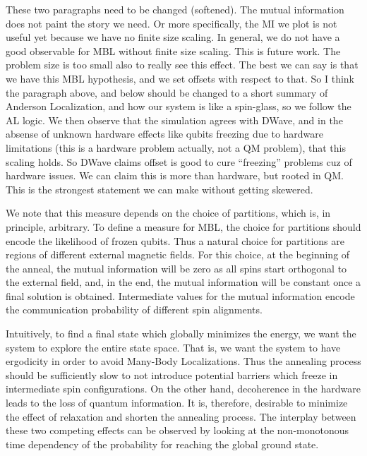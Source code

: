 \documentclass[prd,twocolumn,tightenlines,preprintnumbers,showpacs,superscriptaddress,notitlepage,nofootinbib,eqsecnum,floatfix,longbibliography,aps,10pt]{revtex4-2}
\begin{document}
{\color{blue} These two paragraphs need to be changed (softened). The mutual information does not paint the story we need. Or more specifically, the MI we plot is not useful yet because we have no finite size scaling. In general, we do not have a good observable for MBL without finite size scaling. This is future work. The problem size is too small also to really see this effect. The best we can say is that we have this MBL hypothesis, and we set offsets with respect to that. So I think the paragraph above, and below should be changed to a short summary of Anderson Localization, and how our system is like a spin-glass, so we follow the AL logic. We then observe that the simulation agrees with DWave, and in the absense of unknown hardware effects like qubits freezing due to hardware limitations (this is a hardware problem actually, not a QM problem), that this scaling holds. So DWave claims offset is good to cure ``freezing'' problems cuz of hardware issues. We can claim this is more than hardware, but rooted in QM. This is the strongest statement we can make without getting skewered.}
{\color{red}
We note that this measure depends on the choice of partitions, which is, in principle, arbitrary.
To define a measure for MBL, the choice for partitions should encode the likelihood of frozen qubits.
Thus a natural choice for partitions are regions of different external magnetic fields.
For this choice, at the beginning of the anneal, the mutual information will be zero as all spins start orthogonal to the external field, and, in the end, the mutual information will be constant once a final solution is obtained.
Intermediate values for the mutual information encode the communication probability of different spin alignments.

Intuitively, to find a final state which globally minimizes the energy, we want the system to explore the entire state space.
That is, we want the system to have ergodicity in order to avoid Many-Body Localizations.
Thus the annealing process should be sufficiently slow to not introduce potential barriers which freeze in intermediate spin configurations.
On the other hand, decoherence in the hardware leads to the loss of quantum information.
It is, therefore, desirable to minimize the effect of relaxation and shorten the annealing process.
The interplay between these two competing effects can be observed by looking at the non-monotonous time dependency of the probability for reaching the global ground state.
}
\end{document}
